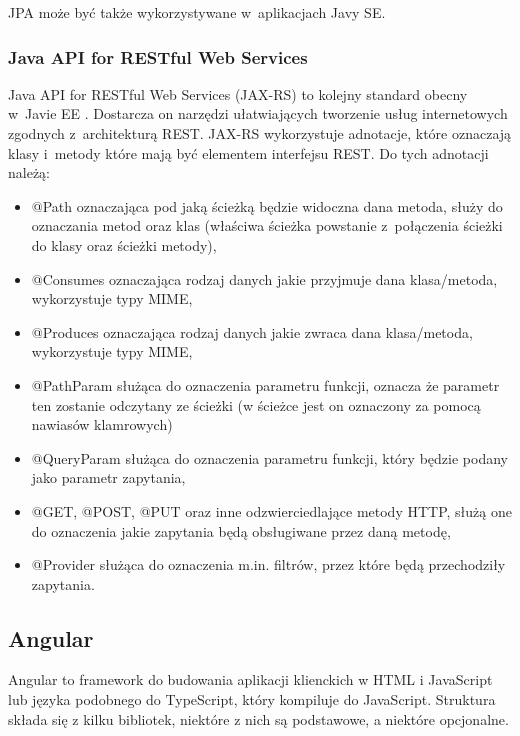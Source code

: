 JPA może być także wykorzystywane w~aplikacjach Javy SE.
 
\subsubsection{Java API for RESTful Web Services}
Java API for RESTful Web Services (JAX-RS) to kolejny standard obecny w~Javie EE \cite{rest_Oracle_doc}. Dostarcza on narzędzi ułatwiających tworzenie usług internetowych zgodnych z~architekturą REST. JAX-RS wykorzystuje adnotacje, które oznaczają klasy i~metody które mają być elementem interfejsu REST. Do tych adnotacji należą:
\begin{itemize}
	\item @Path oznaczająca pod jaką ścieżką będzie widoczna dana metoda, służy do oznaczania metod oraz klas (właściwa ścieżka powstanie z~połączenia ścieżki do klasy oraz ścieżki metody),
	\item @Consumes oznaczająca rodzaj danych jakie przyjmuje dana klasa/metoda, wykorzystuje typy MIME,
	\item @Produces oznaczająca rodzaj danych jakie zwraca dana klasa/metoda, wykorzystuje typy MIME,
	\item @PathParam służąca do oznaczenia parametru funkcji, oznacza że parametr ten zostanie odczytany ze ścieżki (w ścieżce jest on oznaczony za pomocą nawiasów klamrowych)
	\item @QueryParam służąca do oznaczenia parametru funkcji, który będzie podany jako parametr zapytania,
	\item @GET, @POST, @PUT oraz inne odzwierciedlające metody HTTP, służą one do oznaczenia jakie zapytania będą obsługiwane przez daną metodę,
	\item @Provider służąca do oznaczenia m.in. filtrów, przez które będą przechodziły zapytania.
\end{itemize}

\subsection{Angular}
Angular to framework do budowania aplikacji klienckich w HTML i JavaScript lub języka podobnego do TypeScript, który kompiluje do JavaScript. Struktura składa się z kilku bibliotek, niektóre z nich są podstawowe, a niektóre opcjonalne. 

